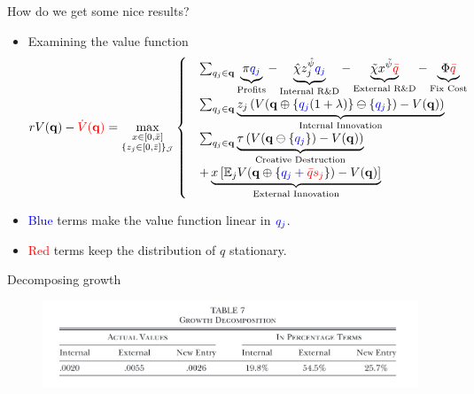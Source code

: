 \documentclass[usenames,dvipsnames,aspectratio=169]{beamer}
\begin{document}
\begin{frame}{How do we get some nice results?}
\begin{itemize}[label=\textcolor{teal}{$\blacktriangleright$}]
\item Examining the value function
\begin{align*}
rV(\mathbf{q}) - \textcolor{red}{\dot{V}(\mathbf{q})} = \max_{\substack{x\in[0,\bar{x}] \\ \{z_j\in[0,\bar{z}]\}_{\mathcal{J}} }}\begin{cases}
 &\sum_{q_j\in\mathbf{q}}\underbrace{\pi \textcolor{blue}{q_j}}_{\text{Profits}} - \underbrace{\hat{\chi}z_j^{\hat{\psi}}\textcolor{blue}{q_j}}_{\text{Internal R\&D}} - \underbrace{\tilde{\chi}x^{\tilde{\psi}}\textcolor{red}{\bar{q}}}_{\text{External R\&D}} -\underbrace{\Phi\textcolor{red}{\bar{q}}}_{\text{Fix Cost}}  \\
&\sum_{q_j\in\mathbf{q}} \underbrace{z_j\left(V(\mathbf{q}\oplus\{\textcolor{blue}{q_j}(1+\lambda)\}\ominus\{\textcolor{blue}{q_j}\} ) - V(\mathbf{q})\right) }_{\text{Internal Innovation}} \\ 
&\sum_{q_j\in\mathbf{q}} \underbrace{\tau\left(V(\mathbf{q}\ominus\{\textcolor{blue}{q_j}\} ) - V(\mathbf{q})\right) }_{\text{Creative Destruction}} \\ 
&+ \underbrace{x\left[\mathbb{E}_jV(\mathbf{q}\oplus\{\textcolor{blue}{q_j+\textcolor{red}{\bar{q}s_j}} \})-V(\mathbf{q}) \right]}_{\text{External Innovation}}
\end{cases}
\end{align*}
 \item \textcolor{blue}{Blue} terms make the value function linear in $\textcolor{blue}{q_j}$. 
  \item \textcolor{red}{Red} terms keep the distribution of $q$ stationary. 

\end{itemize}

\end{frame}

\begin{frame}{Decomposing growth}
\begin{figure}[h]
\includegraphics[width=\textwidth]{Figures/week2fig1.png}
\end{figure}
\end{frame}
\end{document}
